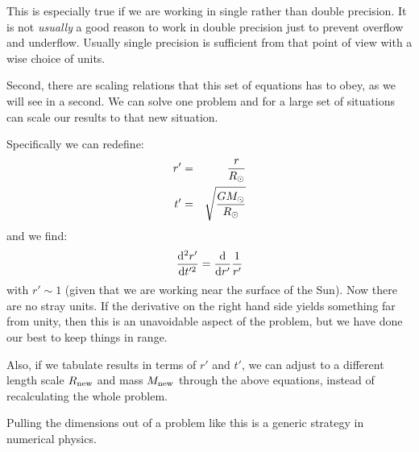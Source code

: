 This is especially true if we are working in single rather than double
precision. It is not {\it usually} a good reason to work in double
precision just to prevent overflow and underflow. Usually single
precision is sufficient from that point of view with a wise choice of
units.

Second, there are scaling relations that this set of equations has to
obey, as we will see in a second. We can solve one problem and for a
large set of situations can scale our results to that new situation.

Specifically we can redefine:
\begin{eqnarray}
r' &=& \frac{r}{R_\odot} \cr
t' &=& \sqrt{\frac{GM_\odot}{R_\odot}}
\end{eqnarray}
and we find:
\begin{equation}
\frac{{\rm d}^2r'}{{\rm d}t'^2} = 
\frac{{\rm d}}{{\rm d}r'} \frac{1}{r'}
\end{equation}
with $r' \sim 1$ (given that we are working near the surface of the
Sun). Now there are no stray units. If the derivative on the right
hand side yields something far from unity, then this is an unavoidable
aspect of the problem, but we have done our best to keep things in
range.

Also, if we tabulate results in terms of $r'$ and $t'$, we can adjust
to a different length scale $R_{\rm new}$ and mass $M_{\rm new}$
through the above equations, instead of recalculating the whole
problem.

Pulling the dimensions out of a problem like this is a generic
strategy in numerical physics.
